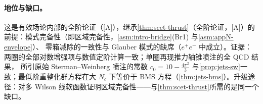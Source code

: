 \paragraph{地位与缺口。}
这是有效场论内部的全阶论证（[A]），继承\cref{thm:scet-thrust}（全阶论证，[A]）的前提：模式完备性（即区域完备性，\cref{asm:intro-bridge}(Br1) 与\cref{asm:appN-envelope}）、
零箱减除的一致性与 Glauber 模式的缺席（$e^+e^-$ 中成立）。证据：两圈的全部对数增强项与数值定阶计算一致\cite{Becher:2016mmh}；单圈再现推力轴锥喷注的全 QCD 结果，
所引原始 Sterman--Weinberg 喷注的常数 $c_0=10-\frac{4\pi^2}{3}$ 与\cref{prop:jets-sw}一致\cite[式~(1)]{Becher:2015hka}；最低阶重整化群方程在大 $N_c$ 下等价于 BMS 方程（\cref{thm:jets-bms}）\cite[第~5~节]{Becher:2016mmh}。升级途径：对多 Wilson 线软函数证明区域完备性——与\cref{thm:scet-thrust}所需的是同一个缺口。
